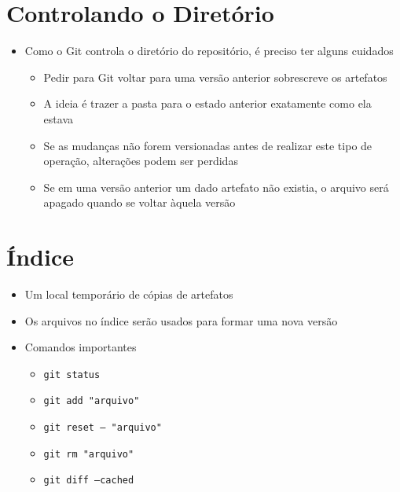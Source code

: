\documentclass{beamer}
\newenvironment{slide}{\begin{frame}{\insertsection}}{\end{frame}}
\begin{document}
\section{Controlando o Diretório}
\begin{slide}
    \begin{itemize}
        \item Como o Git controla o diretório do repositório, é preciso ter
            alguns cuidados
        \begin{itemize}
            \pause
            \item Pedir para Git voltar para uma versão anterior sobrescreve os
                artefatos
            \pause
            \item A ideia é trazer a pasta para o estado anterior exatamente
                como ela estava
            \pause
            \item Se as mudanças não forem versionadas antes de realizar este
                tipo de operação, alterações podem ser perdidas
            \pause
            \item Se em uma versão anterior um dado artefato não existia, o
                arquivo será apagado quando se voltar àquela versão
        \end{itemize}
    \end{itemize}
\end{slide}

\section{Índice}
\begin{slide}
    \begin{itemize}
        \item Um local temporário de cópias de artefatos
        \pause
        \item Os arquivos no índice serão usados para formar uma nova versão
        \pause
        \item Comandos importantes
        \begin{itemize}
            \pause
            \item \texttt{git status}
            \pause
            \item \texttt{git add "arquivo"}
            \pause
            \item \texttt{git reset -- "arquivo"}
            \pause
            \item \texttt{git rm "arquivo"}
            \pause
            \item \texttt{git diff --cached}
        \end{itemize}
    \end{itemize}
\end{slide}
\end{document}
